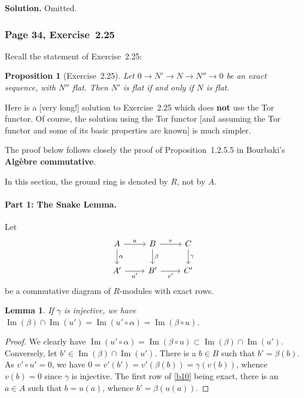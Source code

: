 \documentclass[12pt,letterpaper]{article}%
\newcommand{\oo}{\operatorname}\newcommand{\ooo}{\operatorname*}
\newcommand{\nn}{\noindent}
\newtheorem{lem}[thm]{Lemma}
\newtheorem{prop}[thm]{Proposition}
\begin{document}
\nn\textbf{Solution.} Omitted.%

\subsubsection{Page 34, Exercise~2.25}%

Recall the statement of Exercise~2.25:

\begin{prop}[Exercise~2.25]\label{e225}
Let $0\to N'\to N\to N''\to0$ be an exact sequence, with $N''$ flat. Then $N'$ is flat if and only if $N$ is flat.
\end{prop}

Here is a [very long!] solution to Exercise~2.25 which does \textbf{not} use the Tor functor. Of course, the solution using the Tor functor [and assuming the Tor functor and some of its basic properties are known] is much simpler.

The proof below follows closely the proof of Proposition~1.2.5.5 in Bourbaki's \textbf{Algèbre commutative}.

In this section, the ground ring is denoted by $R$, not by $A$.

\paragraph{Part 1: The Snake Lemma.}%

Let 
\begin{equation}\label{b10}
\begin{tikzcd}
A\ar[d,"\alpha"]\ar[r,"u"]&B\ar[d,"\beta"]\ar[r,"v"]&C\ar[d,"\gamma"]\\ 
A'\ar[r,"u'"']&B'\ar[r,"v'"']&C'
\end{tikzcd}
\end{equation}
be a commutative diagram of $R$-modules with exact rows. 

\begin{lem}\label{b1i}
If $\gamma$ is injective, we have $\oo{Im}(\beta)\cap\oo{Im}(u')=\oo{Im}(u'\circ\alpha)=\oo{Im}(\beta\circ u)$. 
\end{lem}

\begin{proof}
We clearly have $\oo{Im}(u'\circ\alpha)=\oo{Im}(\beta\circ u)\subset\oo{Im}(\beta)\cap\oo{Im}(u')$. Conversely, let $b'\in\oo{Im}(\beta)\cap\oo{Im}(u')$. There is a $b\in B$ such that $b'=\beta(b)$. As $v'\circ u'=0$, we have $0=v'(b')=v'(\beta(b))=\gamma(v(b))$, whence $v(b)=0$ since $\gamma$ is injective. The first row of \eqref{b10} being exact, there is an $a\in A$ such that $b=u(a)$, whence $b'=\beta(u(a))$.
\end{proof}
\end{document}
